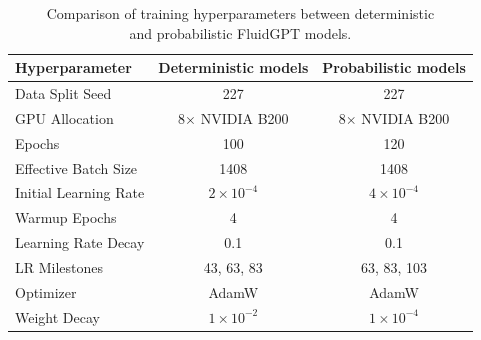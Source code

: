 
\begin{table}[th]
\centering
\caption{Comparison of training hyperparameters between deterministic \\and probabilistic FluidGPT models.}
\label{tab:fluidgpt_hparams}
\begin{tabular}{lcc}
\toprule
\textbf{Hyperparameter} & \textbf{Deterministic models} & \textbf{Probabilistic models} \\
\midrule
Data Split Seed         & 227              & 227              \\
GPU Allocation          & 8$\times$ NVIDIA B200 & 8$\times$ NVIDIA B200 \\
Epochs                  & 100              & 120              \\
Effective Batch Size    & 1408             & 1408             \\
Initial Learning Rate   & $2\times10^{-4}$ & $4\times10^{-4}$ \\
Warmup Epochs           & 4                & 4                \\
Learning Rate Decay     & 0.1              & 0.1              \\
LR Milestones           & 43, 63, 83       & 63, 83, 103      \\
Optimizer               & AdamW            & AdamW            \\
Weight Decay            & $1\times10^{-2}$ & $1\times10^{-4}$ \\
\bottomrule
\end{tabular}
\end{table}